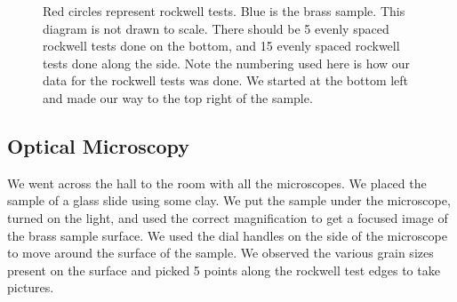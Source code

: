 \documentclass{article}
\begin{document}
\begin{figure}[H]
\centering
{}
\caption{Red circles represent rockwell tests. Blue is the brass sample. This diagram is not drawn to scale. There should be 5 evenly spaced rockwell tests done on the bottom, and 15 evenly spaced rockwell tests done along the side. Note the numbering used here is how our data for the rockwell tests was done. We started at the bottom left and made our way to the top right of the sample. }
\end{figure}

\subsection{Optical Microscopy}
We went across the hall to the room with all the microscopes. We placed the sample of a glass slide using some clay. We put the sample under the microscope, turned on the light, and used the correct magnification to get a focused image of the brass sample surface. We used the dial handles on the side of the microscope to move around the surface of the sample. We observed the various grain sizes present on the surface and picked 5 points along the rockwell test edges to take pictures.
\end{document}
